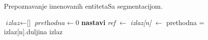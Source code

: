 \documentclass{beamer}
\begin{document}
\begin{frame}{Prepoznavanje imenovanih entiteta}{Sa segmentacijom.}
  \begin{algorithm}[H]
  \begin{algorithmic}[1]
  \State $\textit{izlaz} \gets \text{[]}$
  \State $\textit{prethodna} \gets 0$
      \State \textbf{nastavi} 
    \EndIf
    \State \textit{ref} $\gets$ 
    \State \textit{izlaz[n]} $\gets$ 
    \State prethodna = izlaz[n].duljina
  \EndFor
  \State {}
  \Return izlaz
  \EndFunction
  \end{algorithmic}
  \end{algorithm}
\end{frame}
\end{document}
